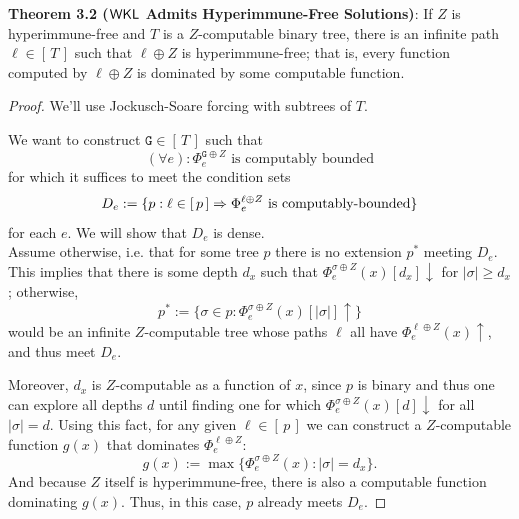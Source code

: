 \documentclass{amsart}
\begin{document}
	\noindent \textbf{Theorem 3.2 ($\sf{WKL}$ Admits Hyperimmune-Free Solutions)}: If $Z$ is hyperimmune-free and $T$ is a $Z$-computable binary tree, there is an infinite path $\ell\in [\,T\,]$ such that $\ell\oplus Z$ is hyperimmune-free; that is, every function computed by $\ell\oplus Z$ is dominated by some computable function.  
	\begin{proof} We'll use Jockusch-Soare forcing with subtrees of $T$.
		
		We want to construct $\mathtt{G}\in [\,T\,]$ such that
		$$
		(\forall e): \Phi_e^{\mathtt{G}\oplus Z} \text{ is computably bounded} 
		$$
		for which it suffices to meet the condition sets
		$$
		D_e := \{p: \ell \in [\,p\,] \Rightarrow \Phi_e^{\ell\oplus Z} \text{ is computably-bounded}\}
		$$
		for each $e$. We will show that $D_e$ is dense. \\
		
		Assume otherwise, i.e. that for some tree $p$ there is no extension $p^*$ meeting $D_e$. This implies that there is some depth $d_x$ such that $\Phi_e^{\sigma\oplus Z}(x)[d_x]\downarrow$ for $|\sigma|\geq d_x$; otherwise,
		$$
		p^* := \{\sigma\in p : \Phi_e^{\sigma\oplus Z}(x)[|\sigma|]\uparrow \}
		$$
		would be an infinite $Z$-computable tree whose paths $\ell$ all have $\Phi_e^{\ell\oplus Z}(x)\uparrow$, and thus meet $D_e$.
		
		Moreover, $d_x$ is $Z$-computable as a function of $x$, since $p$ is binary and thus one can explore all depths $d$ until finding one for which $\Phi_e^{\sigma\oplus Z}(x)[d]\downarrow$ for all $|\sigma|=d$. Using this fact, for any given $\ell\in [\,p\,]$ we can construct a $Z$-computable function $g(x)$ that dominates $\Phi_e^{\ell\oplus Z}$:
		$$
		g(x) := \max\{\Phi_e^{\sigma\oplus Z}(x): |\sigma|=d_x\}.
		$$
		And because $Z$ itself is hyperimmune-free, there is also a computable function dominating $g(x)$. Thus, in this case, $p$ already meets $D_e$.
	\end{proof}\\
	
\end{document}
